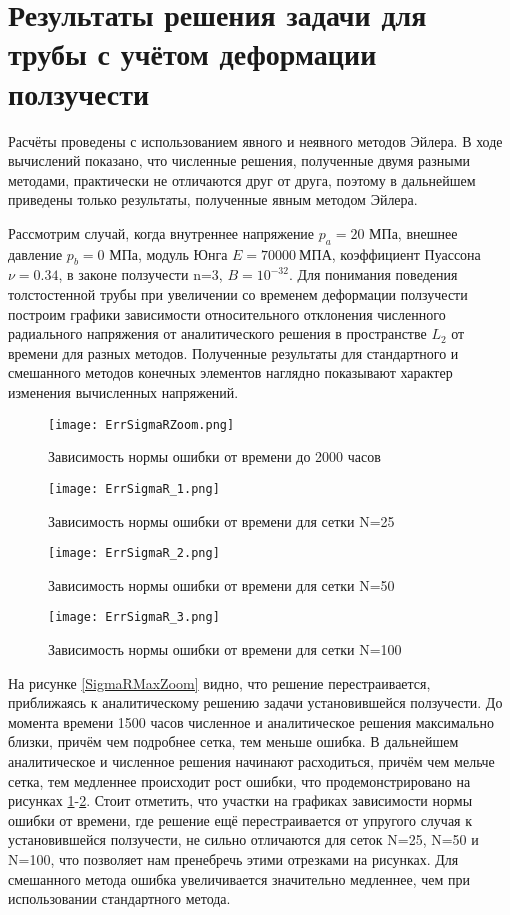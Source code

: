 \documentclass[a4paper,14pt]{extarticle}
\begin{document}
\newpage

\section{Результаты решения задачи для трубы с учётом деформации ползучести}

Расчёты проведены с использованием явного и неявного методов Эйлера. В ходе вычислений показано, что численные решения, полученные двумя разными методами, практически не отличаются друг от друга, поэтому в дальнейшем приведены только результаты, полученные явным методом Эйлера. 

Рассмотрим случай, когда внутреннее напряжение $p_a=20$ МПа, внешнее давление $p_b=0$ МПа, модуль Юнга $E=70000 \:\text{МПА}$, коэффициент Пуассона $\nu=0.34$, в законе ползучести n=3, $B=10^{-32}$. Для понимания поведения толстостенной трубы при увеличении со временем деформации ползучести построим графики зависимости относительного отклонения численного радиального напряжения от аналитического решения в пространстве $L_2$ от времени для разных методов. Полученные результаты для стандартного и смешанного методов конечных элементов наглядно показывают характер изменения вычисленных напряжений.

\begin{figure}[ht]
\centering
\texttt{[image: ErrSigmaRZoom.png]}
\caption{Зависимость нормы ошибки от времени до 2000 часов}
\label{SigmaRMaxZoom}
\bigskip
\texttt{[image: ErrSigmaR\_1.png]}
\caption{Зависимость нормы ошибки от времени для сетки N=25}
\label{SigmaRMax1}
\end{figure}
\newpage
\begin{figure}[ht]
\centering
\texttt{[image: ErrSigmaR\_2.png]}
\caption{Зависимость нормы ошибки от времени для сетки N=50}
\label{SigmaRMax2}
\bigskip
\texttt{[image: ErrSigmaR\_3.png]}
\caption{Зависимость нормы ошибки от времени для сетки N=100}
\label{SigmaRMax3}
\end{figure}

На рисунке \ref{SigmaRMaxZoom} видно, что решение перестраивается, приближаясь к аналитическому решению задачи установившейся ползучести. До момента времени 1500 часов численное и аналитическое решения максимально близки, причём чем подробнее сетка, тем меньше ошибка. В дальнейшем аналитическое и численное решения начинают расходиться, причём чем мельче сетка, тем медленнее происходит рост ошибки, что продемонстрировано на рисунках \ref{SigmaRMax1}-\ref{SigmaRMax3}. Стоит отметить, что участки на графиках зависимости нормы ошибки от времени, где решение ещё перестраивается от упругого случая к установившейся ползучести, не сильно отличаются для сеток N=25, N=50 и N=100, что позволяет нам пренебречь этими отрезками на рисунках. Для смешанного метода ошибка увеличивается значительно медленнее, чем при использовании стандартного метода. 
\end{document}
